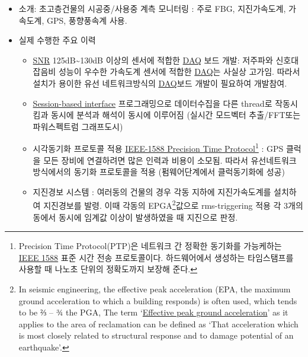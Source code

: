 \documentclass[10pt,a4paper,ragged2e]{altacv}
\begin{document}
\begin{fullwidth}
\begin{itemize}
\item 소개: 초고층건물의 시공중/사용중 계측 모니터링 : 주로 FBG, 지진가속도계, 가속도계, GPS, 풍향풍속계 사용.
\item 실제 수행한 주요 이력
  \begin{itemize}
    \item \href{https://en.wikipedia.org/wiki/Signal-to-noise_ratio}{SNR} 125dB\textasciitilde{}130dB 이상의 센서에 적합한 \href{https://en.wikipedia.org/wiki/Data_acquisition}{DAQ} 보드 개발: 저주파와 신호대잡음비 성능이 우수한 가속도계 센서에 적합한 \href{https://en.wikipedia.org/wiki/Data_acquisition}{DAQ}는 사실상 고가임. 따라서 설치가 용이한 유선 네트워크방식의 \href{https://en.wikipedia.org/wiki/Data_acquisition}{DAQ}보드 개발이 필요하여 개발참여.
    \item \href{http://kr.mathworks.com/help/daq/examples/getting-started-with-session-based-interface-using-ni-devices.html}{Session-based interface} 프로그래밍으로 데이터수집을 다른 thread로 작동시킴과 동시에 분석과 해석이 동시에 이루어짐 (실시간 모드벡터 추출/FFT또는 파워스펙트럼 그래프도시)
    \item 시각동기화 프로토콜 적용 \href{https://ko.wikipedia.org/wiki/IEEE_1588}{IEEE-1588 Precision Time Protocol}\footnote{Precision Time Protocol(PTP)은 네트워크 간 정확한 동기화를 가능케하는 \href{https://ko.wikipedia.org/wiki/IEEE_1588}{IEEE 1588} 표준 시간 전송 프로토콜이다. 하드웨어에서 생성하는 타임스탬프를 사용할 때 나노초 단위의 정확도까지 보장해 준다.} : GPS 클럭을 모든 장비에 연결하려면 많은 인력과 비용이 소모됨. 따라서 유선네트워크 방식에서의 동기화 프로토콜을 적용 (펌웨어단계에서 클럭동기화에 성공)
    \item 지진경보 시스템 : 여러동의 건물의 경우 각동 지하에 지진가속도계를 설치하여 지진경보를 발령. 이때 각동의 EPGA\footnote{In seismic engineering, the effective peak acceleration (EPA, the maximum ground acceleration to which a building responds) is often used, which tends to be ⅔ -- ¾ the PGA, The term `\href{http://www.teachmefinance.com/Scientific_Terms/Effective\%20peak\%20ground\%20acceleration.html\#ixzz3iNuQcQLs}{Effective peak ground acceleration}' as it applies to the area of reclamation can be defined as `That acceleration which is most closely related to structural response and to damage potential of an earthquake'.}값으로 rms-triggering 적용 각 3개의 동에서 동시에 임계값 이상이 발생하였을 때 지진으로 판정.

\end{itemize}
\end{itemize}
\end{fullwidth}
\end{document}
